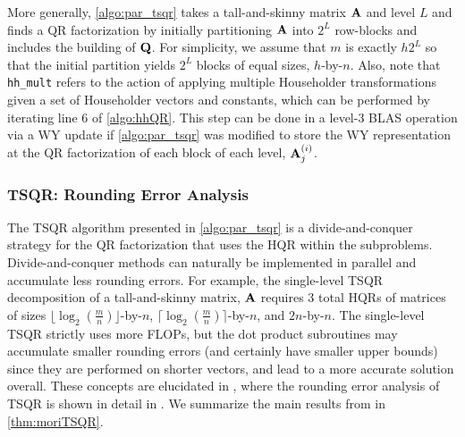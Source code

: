 More generally, \cref{algo:par_tsqr} takes a tall-and-skinny matrix $\mathbf{A}$ and level $L$ and finds a QR factorization by initially partitioning $\mathbf{A}$ into $2^L$ row-blocks and includes the building of $\mathbf{Q}$.
For simplicity, we assume that $m$ is exactly $h2^L$ so that the initial partition yields $2^L$ blocks of equal sizes, $h$-by-$n$. 
Also, note that {\tt hh\_mult} refers to the action of applying multiple Householder transformations given a set of Householder vectors and constants, which can be performed by iterating line 6 of \cref{algo:hhQR}.
This step can be done in a level-3 BLAS operation via a WY update if \cref{algo:par_tsqr} was modified to store the WY representation at the QR factorization of each block of each level, $\mathbf{A}_j^{(i)}$. 

\subsubsection{TSQR: Rounding Error Analysis}
\label{sec:TSQRre}
The TSQR algorithm presented in \cref{algo:par_tsqr} is a divide-and-conquer strategy for the QR factorization that uses the HQR within the subproblems. 
Divide-and-conquer methods can naturally be implemented in parallel and accumulate less rounding errors.
For example, the single-level TSQR decomposition of a tall-and-skinny matrix, $\mathbf{A}$ requires 3 total HQRs of matrices of sizes $\lfloor\log_{2}(\frac{m}{n})\rfloor$-by-$n$, $\lceil\log_{2}(\frac{m}{n})\rceil$-by-$n$, and $2n$-by-$n$.
The single-level TSQR strictly uses more FLOPs, but the dot product subroutines may accumulate smaller rounding errors (and certainly have smaller upper bounds) since they are performed on shorter vectors, and lead to a more accurate solution overall.
These concepts are elucidated in \cite{Mori2012}, where the rounding error analysis of TSQR is shown in detail in \cite{Mori2012}.
We summarize the main results from \cite{Mori2012} in \cref{thm:moriTSQR}.



